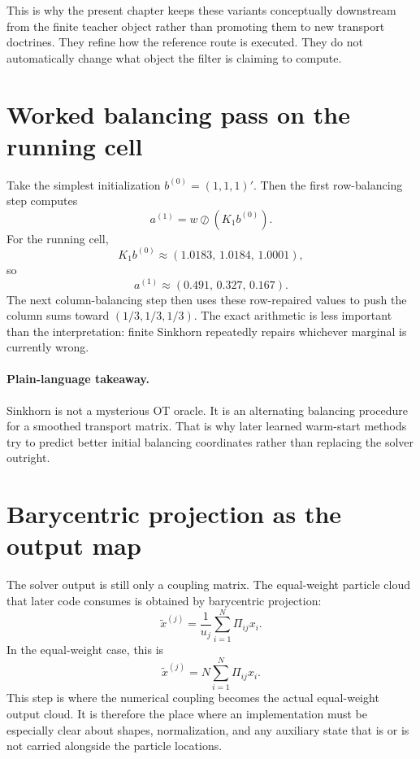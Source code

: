 This is why the present chapter keeps these variants conceptually downstream from
the finite teacher object rather than promoting them to new transport doctrines.
They refine how the reference route is executed.  They do not automatically change
what object the filter is claiming to compute.

\section{Worked balancing pass on the running cell}
\label{sec:bf-eot-worked-balance}

Take the simplest initialization \(b^{(0)}=(1,1,1)'\).  Then the first
row-balancing step computes
\begin{equation}
\label{eq:bf-eot-first-row-balance}
  a^{(1)} = w \oslash (K_1 b^{(0)}).
\end{equation}
For the running cell,
\[
  K_1 b^{(0)}
  \approx
  (1.0183,\,1.0184,\,1.0001),
\]
so
\[
  a^{(1)}
  \approx
  (0.491,\,0.327,\,0.167).
\]
The next column-balancing step then uses these row-repaired values to push the
column sums toward \((1/3,1/3,1/3)\).  The exact arithmetic is less important
than the interpretation: finite Sinkhorn repeatedly repairs whichever marginal is
currently wrong.

\paragraph{Plain-language takeaway.}
Sinkhorn is not a mysterious OT oracle.  It is an alternating balancing procedure
for a smoothed transport matrix.  That is why later learned warm-start methods try
to predict better initial balancing coordinates rather than replacing the solver
outright.

\section{Barycentric projection as the output map}
\label{sec:bf-eot-barycentric}

The solver output is still only a coupling matrix.  The equal-weight particle cloud
that later code consumes is obtained by barycentric projection:
\begin{equation}
\label{eq:bf-eot-barycentric}
  \tilde x^{(j)}
  =
  \frac{1}{u_j}\sum_{i=1}^N \Pi_{ij}x_i.
\end{equation}
In the equal-weight case, this is
\begin{equation}
\label{eq:bf-eot-barycentric-equal}
  \tilde x^{(j)}=N\sum_{i=1}^N \Pi_{ij}x_i.
\end{equation}
This step is where the numerical coupling becomes the actual equal-weight output
cloud.  It is therefore the place where an implementation must be especially clear
about shapes, normalization, and any auxiliary state that is or is not carried
alongside the particle locations.


